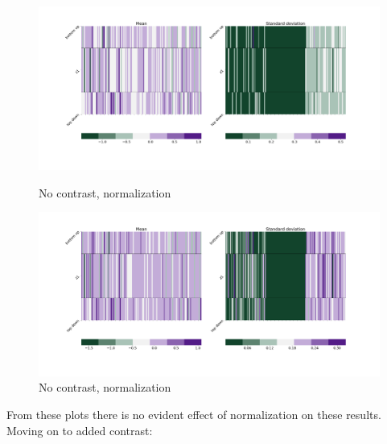 \documentclass[12pt, english]{article}
\begin{document}
\begin{figure}[H]
  \begin{minipage}[b]{0.5\linewidth}
    \centering
    \includegraphics[width=.75\linewidth]{z1_vis/z1_vis_no_contrast_norm/17_DenseLinLinLadderVAE_contrastNorm-stats-1_vector_comparisons_1.png} 
    \caption{No contrast, normalization}
    \label{fig:sample-norm-no-contrast-1}
  \end{minipage}
  \begin{minipage}[b]{0.5\linewidth}
    \centering
    \includegraphics[width=.75\linewidth]{z1_vis/z1_vis_no_contrast_norm/17_DenseLinLinLadderVAE_contrastNorm-stats-2_vector_comparisons_1.png}
    \caption{No contrast, normalization}
    \label{fig:sample-norm-no-contrast-2}
  \end{minipage}
\end{figure}

\vspace{4mm}

\par From these plots there is no evident effect of normalization on these results. Moving on to added contrast:

\vspace{4mm}
\end{document}
